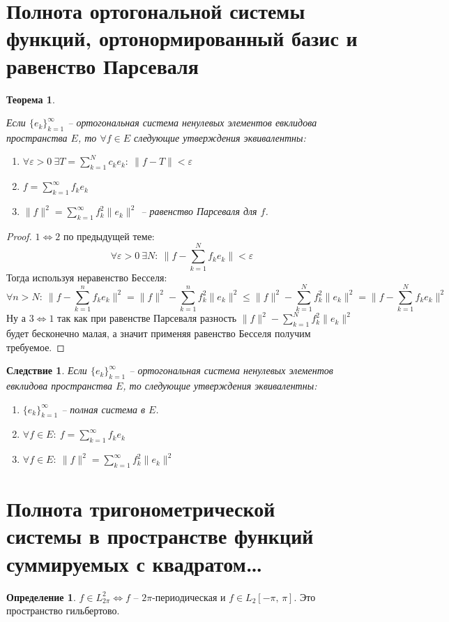 \documentclass[a4paper,12pt]{article}
\renewcommand{\leq}{\ensuremath{\leqslant}}
\theoremstyle{plain}
\newtheorem{theorem}{Теорема}[section]
\newtheorem*{corollary}{Следствие}
\theoremstyle{definition}
\newtheorem{definition}{Определение}[section]
\theoremstyle{remark}
\begin{document}
\section{Полнота ортогональной системы функций, ортонормированный базис и равенство Парсеваля}
\begin{theorem}
	\label{THREE_EQUIV}

	Если $\{e_k\}_{k = 1}^\infty$ -- ортогональная система ненулевых элементов евклидова пространства $E$, то $\forall f \in E$ следующие утверждения эквивалентны:
	\begin{enumerate}
		\item $\forall \varepsilon > 0 \: \exists T = \sum_{k = 1}^N c_ke_k :\: \|f - T\| < \varepsilon$
		\item $f = \sum_{k = 1}^\infty f_ke_k$
		\item $\|f\|^2 = \sum_{k = 1}^\infty f_k^2 \|e_k\|^2$ -- равенство Парсеваля для $f$.
	\end{enumerate}
\end{theorem}
\begin{proof}
	$1 \Leftrightarrow 2$ по предыдущей теме:
	\[\forall \varepsilon > 0 \: \exists N :\: \|f - \sum_{k = 1}^N f_ke_k\| < \varepsilon\]
	Тогда используя неравенство Бесселя:
	\[\forall n > N :\: \|f - \sum_{k = 1}^n f_ke_k\|^2 = \|f\|^2 - \sum_{k = 1}^n f_k^2\|e_k\|^2 \leq \|f\|^2 - \sum_{k = 1}^N f_k^2\|e_k\|^2 = \|f - \sum_{k = 1}^N f_ke_k\|^2\]
	Ну а $3 \Leftrightarrow 1$ так как при равенстве Парсеваля разность $\|f\|^2 - \sum_{k = 1}^N f_k^2\|e_k\|^2$ будет бесконечно малая, а значит применяя равенство Бесселя получим требуемое.
\end{proof}

\begin{corollary}
	Если $\{e_k\}_{k = 1}^\infty$ -- ортогональная система ненулевых элементов евклидова пространства $E$, то следующие утверждения эквивалентны:
	\begin{enumerate}
		\item $\{e_k\}_{k = 1}^\infty$ -- полная система в $E$.
		\item $\forall f \in E:\: f = \sum_{k = 1}^\infty f_ke_k$
		\item $\forall f \in E:\: \|f\|^2 = \sum_{k = 1}^\infty f_k^2\|e_k\|^2$
	\end{enumerate}
\end{corollary}

\section{Полнота тригонометрической системы в пространстве функций суммируемых с квадратом\dots}
\begin{definition}
	$f \in L_{2\pi}^2 \Leftrightarrow f$ -- $2\pi$-периодическая и $f \in L_2[-\pi,\,\pi]$. Это пространство гильбертово.
\end{definition}
\end{document}
